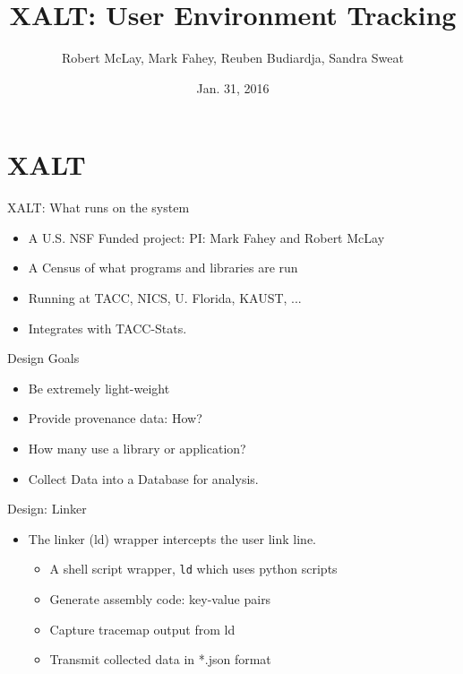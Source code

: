\documentclass{beamer}
\title{XALT: User Environment Tracking}
\author{Robert McLay, Mark Fahey, Reuben Budiardja, Sandra Sweat}
\institute{The Texas Advanced Computing Center, Argonne National Labs, NICS}
\date{Jan. 31, 2016}  %
\begin{document}
\begin{frame}
  \titlepage
\end{frame}

\section{XALT}

\begin{frame}{XALT: What runs on the system}
  \begin{itemize}
    \item A U.S. NSF Funded project: PI: Mark Fahey and Robert McLay
    \item A Census of what programs and libraries are run
    \item Running at TACC, NICS, U. Florida, KAUST, ...
    \item Integrates with TACC-Stats.
  \end{itemize}
\end{frame}

\begin{frame}{Design Goals}
  \begin{itemize}
    \item Be extremely light-weight
    \item Provide provenance data: How?
    \item How many use a library or application?
    \item Collect Data into a Database for analysis.
  \end{itemize}
\end{frame}

\begin{frame}{Design: Linker }
  \begin{itemize}
    \item The linker (ld) wrapper intercepts the user link line.
      \begin{itemize}
        \item A shell script wrapper, \texttt{ld} which uses python
          scripts
        \item Generate assembly code: key-value pairs
        \item Capture tracemap output from ld
        \item Transmit collected data in *.json format
      \end{itemize}
  \end{itemize}
\end{frame}
\end{document}
